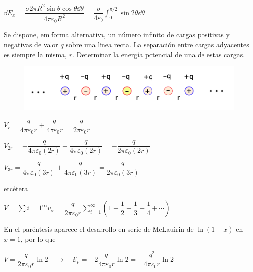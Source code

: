$\displaystyle \dd E_x=\dfrac{\sigma 2 \pi R^2 \sin \theta \cos \theta \dd \theta}{4\pi \varepsilon_0 R^2}=\dfrac{\sigma}{4\varepsilon_0} \int_0^{\pi/2}\sin 2 \theta \dd \theta$

\rightline{ \textbf{\textcolor{blue}{acábese}}}

\justify

\begin{prob}
Se dispone, em forma alternativa, un número infinito de cargas positivas y negativas de valor $q$ sobre una línea recta. La separación entre cargas adyacentes es siempre la misma, $r$. Determinar la energía potencial de una de estas cargas.	
\end{prob}

\begin{figure}[H]
	\centering
	\includegraphics[width=1\textwidth]{imagenes/imagenes23/T23IM16.png}
\end{figure}

$V_r=\dfrac {q}{4\pi \varepsilon_0 r}+\dfrac {q}{4\pi \varepsilon_0 r}=\dfrac {q}{2\pi \varepsilon_0 r}$

$V_{2r}=-\dfrac {q}{4\pi \varepsilon_0 (2r)}-\dfrac {q}{4\pi \varepsilon_0 (2r)}=-\dfrac {q}{2\pi \varepsilon_0 (2r)}$

$V_{3r}=\dfrac {q}{4\pi \varepsilon_0 (3r)}+\dfrac {q}{4\pi \varepsilon_0 (3r)}=\dfrac {q}{2\pi \varepsilon_0 (3r)}$

etcétera

$V=\displaystyle \sum{i=1}^\infty v_{ir}=\dfrac {q}{2\pi \varepsilon_0 r}\sum_{i=1}^\infty
\left( 1-\dfrac 1 2 + \dfrac 1 3 - \dfrac 1 4 + \cdots \right)$

En el paréntesis aparece el desarrollo en serie de McLauirin de $\ln(1+x)$ en $x=1$, por lo que

$V=\dfrac {q}{2\pi \varepsilon_0 r} \ln 2 \quad \to \quad \mathcal E_p=-2 \dfrac {q}{4\pi \varepsilon_0 r} \ln 2 = - \dfrac {q^2}{4\pi \varepsilon_0 r}\ln 2$

